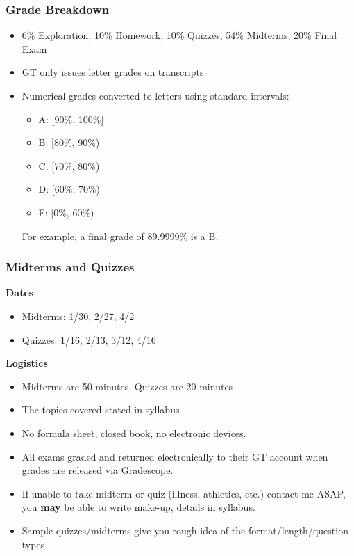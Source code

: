 \documentclass[xcolor=table,11pt,notes=hide,t,handout]{beamer}
\begin{document}
\begin{frame}\frametitle{Grade Breakdown}

\begin{itemize}
    \item 6\% Exploration, 10\% Homework, 10\% Quizzes, 54\% Midterms, 20\% Final Exam
    \item GT only issues letter grades on transcripts
    \item Numerical grades converted to letters using standard intervals:\begin{itemize}
        \item A: [90\%, 100\%]
        \item B: [80\%, 90\%)
        \item C: [70\%, 80\%)
        \item D: [60\%, 70\%)
        \item F: [0\%, 60\%)
    \end{itemize}
    For example, a final grade of 89.9999\% is a B. 
\end{itemize}
\end{frame}



\begin{frame}\frametitle{Midterms and Quizzes}

    
    \textbf{Dates}
    \begin{itemize}
        \item Midterms: 1/30, 2/27, 4/2
        \item Quizzes: 1/16, 2/13, 3/12, 4/16
    \end{itemize}
    \textbf{Logistics}
    \begin{itemize}
        \item Midterms are 50 minutes, Quizzes are 20 minutes 
        \item The topics covered stated in syllabus
        \item No formula sheet, closed book, no electronic devices.
        \item All exams graded and returned electronically to their GT account when grades are released via Gradescope. 
        \item If unable to take midterm or quiz (illness, athletics, etc.) contact me ASAP, you \textbf{may} be able to write make-up, details in syllabus. 
        \item Sample quizzes/midterms give you rough idea of  the format/length/question types
    \end{itemize}

\end{frame}
\end{document}
